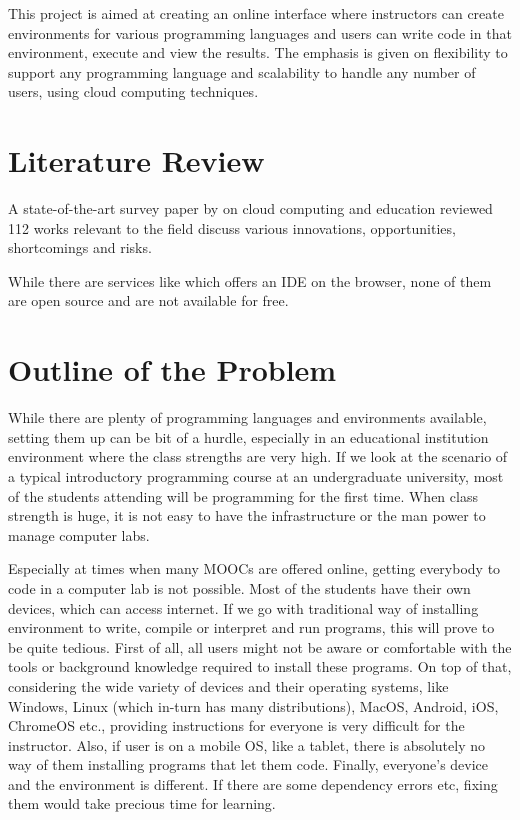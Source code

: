 \documentclass[DD]{iitmdiss}
\begin{document}
This project is aimed at creating an online interface where instructors can create environments for various programming languages and users can write code in that environment, execute and view the results. The emphasis is given on flexibility to support any programming language and scalability to handle any number of users, using cloud computing techniques.
\section{Literature Review}
A state-of-the-art survey paper by \cite{gonzalez-martinez_cloud_2015} on cloud computing and education reviewed 112 works relevant to the field discuss various innovations, opportunities, shortcomings and risks.

While there are services like \cite{codeanywhere} which offers an IDE on the browser, none of them are open source and are not available for free.

\section{Outline of the Problem}

While there are plenty of programming languages and environments available, setting them up can be bit of a hurdle, especially in an educational institution environment where the class strengths are very high. If we look at the scenario of a typical introductory programming course at an undergraduate university, most of the students attending will be programming for the first time. When class strength is huge, it is not easy to have the infrastructure or the man power to manage computer labs. 

Especially at times when many MOOCs are offered online, getting everybody to code in a computer lab is not possible. Most of the students have their own devices, which can access internet. If we go with traditional way of installing environment to write, compile or interpret and run programs, this will prove to be quite tedious. First of all, all users might not be aware or comfortable with the tools or background knowledge required to install these programs. On top of that, considering the wide variety of devices and their operating systems, like Windows, Linux (which in-turn has many distributions), MacOS, Android, iOS, ChromeOS etc., providing instructions for everyone is very difficult for the instructor. Also, if user is on a mobile OS, like a tablet, there is absolutely no way of them installing programs that let them code. Finally, everyone's device and the environment is different. If there are some dependency errors etc, fixing them would take precious time for learning.
\end{document}
